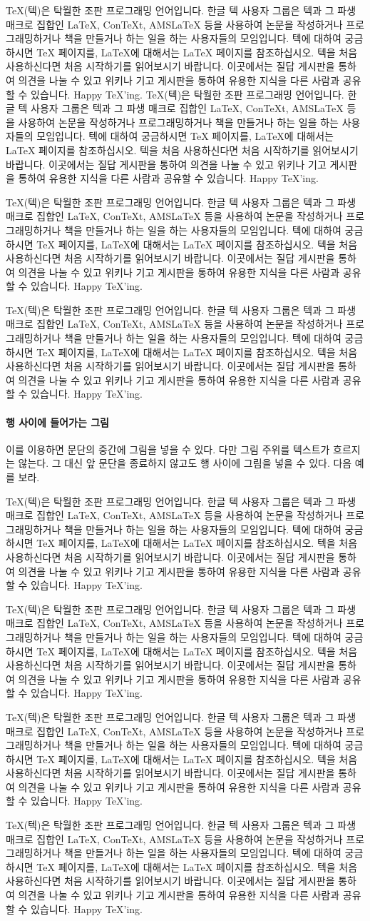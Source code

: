 \documentclass[a4paper,nanum]{oblivoir}
\newcommand\LongText{%
TeX(텍)은 탁월한 조판 프로그래밍 언어입니다. 한글 텍 사용자 그룹은 텍과 그 파생 매크로 집합인 LaTeX, ConTeXt, AMSLaTeX 등을 사용하여 논문을 작성하거나 프로그래밍하거나 책을 만들거나 하는 일을 하는 사용자들의 모임입니다.	 텍에 대하여 궁금하시면 TeX 페이지를, LaTeX에 대해서는 LaTeX 페이지를 참조하십시오. 텍을 처음 사용하신다면 처음 시작하기를 읽어보시기 바랍니다. 이곳에서는 질답 게시판을 통하여 의견을 나눌 수 있고 위키나 기고 게시판을 통하여 유용한 지식을 다른 사람과 공유할 수 있습니다. Happy TeX'ing.
}
\begin{document}
\begin{boxedverbatim}

\LongText \LongText
\end{boxedverbatim}

\medskip

%

\LongText
\LongText

\paragraph{행 사이에 들어가는 그림}

이를 이용하면 문단의 중간에 그림을 넣을 수 있다. 다만 그림 주위를 텍스트가 흐르지는 않는다. 그 대신 앞 문단을 종료하지 않고도 행 사이에 그림을 넣을 수 있다.
다음 예를 보라.

\bigskip

\begin{boxedverbatim}
\LongText
{}
\par\LongText
\end{boxedverbatim}

\LongText
{}
\par\LongText
\end{document}
